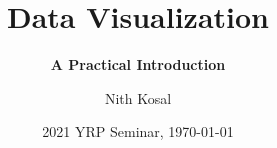 \documentclass[11pt]{beamer}
\begin{document}
	\author[Nith Kosal]{Nith Kosal}
	\title[Presentation Title]{\bfseries Data Visualization}
	\subtitle{\bfseries A Practical Introduction}

	
	\date[\today]{2021 YRP Seminar, \today}

	\begin{frame}[plain]
		\maketitle
		
	\end{frame}
	\setcounter{framenumber}{0}
\end{document}

